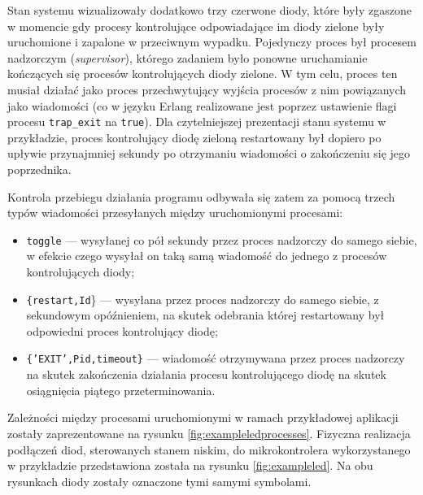 Stan systemu wizualizowały dodatkowo trzy czerwone diody, które były zgaszone w momencie gdy procesy kontrolujące odpowiadające im diody zielone były uruchomione i zapalone w przeciwnym wypadku.
Pojedynczy proces był procesem nadzorczym (\emph{supervisor}), którego zadaniem było ponowne uruchamianie kończących się procesów kontrolujących diody zielone. W tym celu, proces ten musiał działać jako proces przechwytujący wyjścia procesów z nim powiązanych jako wiadomości (co w języku Erlang realizowane jest poprzez ustawienie flagi procesu \texttt{trap\_exit} na \texttt{true}).
Dla czytelniejszej prezentacji stanu systemu w przykładzie, proces kontrolujący diodę zieloną restartowany był dopiero po upływie przynajmniej sekundy po otrzymaniu wiadomości o zakończeniu się jego poprzednika.

Kontrola przebiegu działania programu odbywała się zatem za pomocą trzech typów wiadomości przesyłanych między uruchomionymi procesami:
\begin{itemize}
\item \texttt{toggle} --- wysyłanej co pół sekundy przez proces nadzorczy do samego siebie, w efekcie czego wysyłał on taką samą wiadomość do jednego z procesów kontrolujących diody;
\item \texttt{\{restart,Id}\} --- wysyłana przez proces nadzorczy do samego siebie, z sekundowym opóźnieniem, na skutek odebrania której restartowany był odpowiedni proces kontrolujący diodę;
\item \texttt{\{'EXIT',Pid,timeout\}} --- wiadomość otrzymywana przez proces nadzorczy na skutek zakończenia działania procesu kontrolującego diodę na skutek osiągnięcia piątego przeterminowania.
\end{itemize}

Zależności między procesami uruchomionymi w ramach przykładowej aplikacji zostały zaprezentowane na rysunku \ref{fig:exampleledprocesses}. Fizyczna realizacja podłączeń diod, sterowanych stanem niskim, do mikrokontrolera wykorzystanego w przykładzie przedstawiona została na rysunku \ref{fig:exampleled}. Na obu rysunkach diody zostały oznaczone tymi samymi symbolami.



